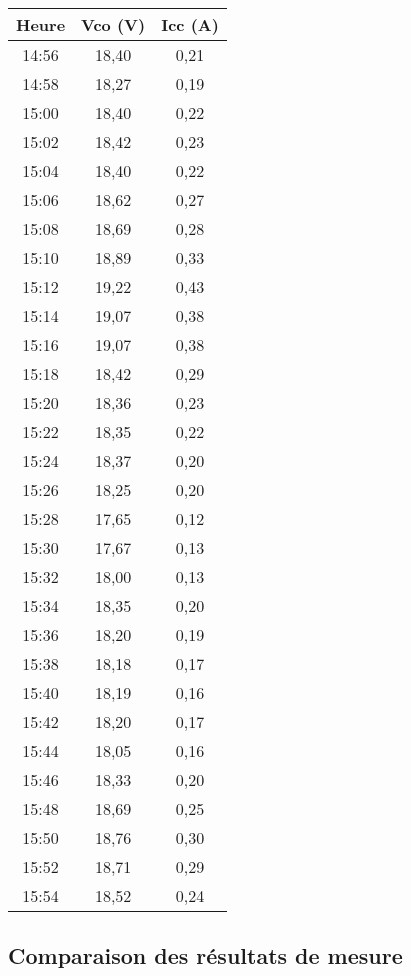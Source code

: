 \begin{table}[H]
	\hfill
	\begin{minipage}[t]{0.45\linewidth}
		\centering
		\begin{tabular}{|c|c|c|}
			\hline
			\textbf{Heure} & \textbf{Vco (V)} & \textbf{Icc (A)} \\
			\hline
			14:56 & 18,40 & 0,21 \\
			14:58 & 18,27 & 0,19 \\
			15:00 & 18,40 & 0,22 \\
			15:02 & 18,42 & 0,23 \\
			15:04 & 18,40 & 0,22 \\
			15:06 & 18,62 & 0,27 \\
			15:08 & 18,69 & 0,28 \\
			15:10 & 18,89 & 0,33 \\
			15:12 & 19,22 & 0,43 \\
			15:14 & 19,07 & 0,38 \\
			15:16 & 19,07 & 0,38 \\
			15:18 & 18,42 & 0,29 \\
			15:20 & 18,36 & 0,23 \\
			15:22 & 18,35 & 0,22 \\
			15:24 & 18,37 & 0,20 \\
			15:26 & 18,25 & 0,20 \\
			15:28 & 17,65 & 0,12 \\
			15:30 & 17,67 & 0,13 \\
			15:32 & 18,00 & 0,13 \\
			15:34 & 18,35 & 0,20 \\
			15:36 & 18,20 & 0,19 \\
			15:38 & 18,18 & 0,17 \\
			15:40 & 18,19 & 0,16 \\
			15:42 & 18,20 & 0,17 \\
			15:44 & 18,05 & 0,16 \\
			15:46 & 18,33 & 0,20 \\
			15:48 & 18,69 & 0,25 \\
			15:50 & 18,76 & 0,30 \\
			15:52 & 18,71 & 0,29 \\
			15:54 & 18,52 & 0,24 \\
			\hline
		\end{tabular}
	\end{minipage}
\end{table}



\subsection{Comparaison des résultats de mesure}
